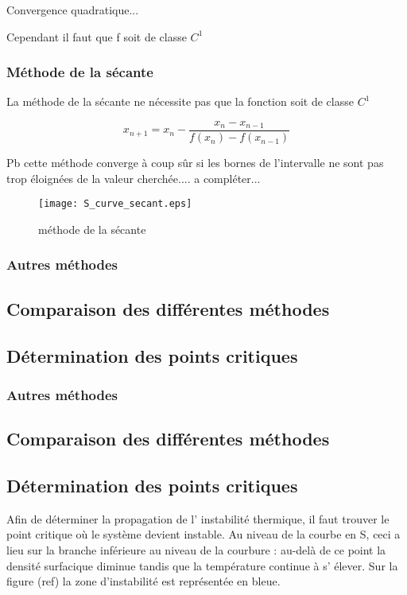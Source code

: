 Convergence quadratique...

Cependant il faut que f soit de classe $C^1$
\\
\subsubsection{Méthode de la sécante}

La méthode de la sécante ne nécessite pas que la fonction soit de classe $C^1$


\begin{equation}
x_{n+1} = x_n - \frac{x_n - x_{n-1}}{f(x_n) - f(x_{n-1})}
\end{equation}

Pb cette méthode converge à coup sûr si les bornes de l'intervalle ne sont pas trop éloignées de la valeur cherchée....
a compléter...

\begin{figure}[htb!]
	\centering
	\texttt{[image: S\_curve\_secant.eps]}
	\caption{méthode de la sécante}
	\label{Fig::bench}
\end{figure}


\subsubsection{Autres méthodes}

\subsection{Comparaison des différentes méthodes}

\subsection{Détermination des points critiques}
\subsubsection{Autres méthodes}

\subsection{Comparaison des différentes méthodes}

\subsection{Détermination des points critiques}
Afin de déterminer la propagation de l' instabilité thermique, il faut trouver le point critique où le système devient instable. Au niveau de la courbe en S, ceci a lieu sur la branche inférieure au niveau de la courbure : au-delà de ce point la densité surfacique diminue tandis que la température continue à s' élever. Sur la figure (ref) la zone d'instabilité est représentée en bleue.

